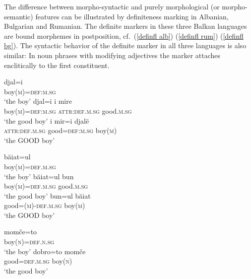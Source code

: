The difference between morpho-syntactic and purely morphological (or morpho-semantic) features can be illustrated by definiteness marking in Albanian, Bulgarian and Rumanian. The definite markers in these three Balkan languages are bound morphemes in postposition, cf.~(\ref{definfl alb}) (\ref{definfl rum}) (\ref{definfl bg}). The syntactic behavior of the definite marker in all three languages is also similar: In noun phrases with modifying adjectives the marker attaches enclitically to the first constituent. 
\begin{exe}
\ex 
{} 
\begin{xlist}
\ex \label{definfl alb}
\gll	djal=i\\
	boy(\textsc{m})=\textsc{def:m.sg}\\
\glt	‘the boy’
\ex \label{encl alb a}
\gll	djal=i 				i 			mire\\
	boy(\textsc{m})=\textsc{def:m.sg} 	\textsc{attr:def.m.sg}	good.\textsc{m.sg}\\
\glt	‘the good boy’
\ex \label{encl alb b}
\gll	i 			mir=i 			djalë\\
	\textsc{attr:def.m.sg} 	good=\textsc{def:m.sg} 	boy(\textsc{m})\\
\glt	‘the GOOD boy’ 
\end{xlist}
\ex 
{}
\begin{xlist}
\ex \label{definfl rum}
\gll	băiat=ul\\
	boy(\textsc{m})=\textsc{def.m.sg}\\
\glt	‘the boy’
\ex \label{encl rum a}
\gll	băiat=ul 				bun\\
	boy(\textsc{m})=\textsc{def.m.sg} 	good.\textsc{m.sg}\\
\glt	‘the good boy’
\ex \label{encl rum b}
\gll	bun=ul 					băiat\\
	good=(\textsc{m})-\textsc{def.m.sg} 	boy(\textsc{m})\\
\glt	‘the GOOD boy’
\end{xlist}
\ex
{}
\begin{xlist}
\ex \label{definfl bg}
\gll	momče=to\\
	boy(\textsc{n})=\textsc{def.n.sg}\\
\glt	‘the boy’
\ex \label{encl bg}
\gll	dobro=to 		momče\\
	good=\textsc{def.m.sg}	boy(\textsc{n})\\
\glt	‘the good boy’
\end{xlist}	
\end{exe}
